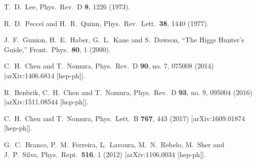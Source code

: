 \documentclass[prd,preprint,superscriptaddress,amsmath,amssymb]{revtex4}
\begin{document}

\begin{thebibliography}{100}

  T.~D.~Lee,
  Phys.\ Rev.\ D {\bf 8}, 1226 (1973).
  
  R.~D.~Peccei and H.~R.~Quinn,
  Phys.\ Rev.\ Lett.\  {\bf 38}, 1440 (1977).
  
  J.~F.~Gunion, H.~E.~Haber, G.~L.~Kane and S.~Dawson,
  ``The Higgs Hunter's Guide,''
  Front.\ Phys.\  {\bf 80}, 1 (2000).
  
  
  C.~H.~Chen and T.~Nomura,
  Phys.\ Rev.\ D {\bf 90}, no. 7, 075008 (2014)
  [arXiv:1406.6814 [hep-ph]].
  
  R.~Benbrik, C.~H.~Chen and T.~Nomura,
  Phys.\ Rev.\ D {\bf 93}, no. 9, 095004 (2016)
  [arXiv:1511.08544 [hep-ph]].

  
  C.~H.~Chen and T.~Nomura,
  Phys.\ Lett.\ B {\bf 767}, 443 (2017)
  [arXiv:1609.01874 [hep-ph]].
  
  G.~C.~Branco, P.~M.~Ferreira, L.~Lavoura, M.~N.~Rebelo, M.~Sher and J.~P.~Silva,
  Phys.\ Rept.\  {\bf 516}, 1 (2012)
  [arXiv:1106.0034 [hep-ph]].
  

\end{thebibliography}
\end{document}

